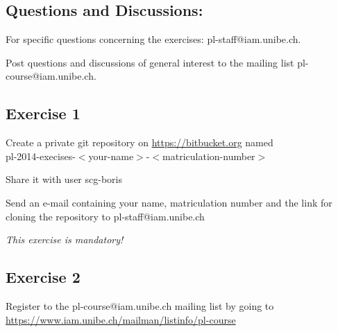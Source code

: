 \documentclass [11pt, a4wide, twoside]{article}
\begin{document}
\subsection*{Questions and Discussions:}
\begin{myitemize}
\item For specific questions concerning the exercises: pl-staff@iam.unibe.ch.
\item Post questions and discussions of general interest to the mailing list pl-course@iam.unibe.ch.
\end{myitemize}


\subsection*{Exercise 1}
\begin{myitemize}
\item Create a private git repository on \url{https://bitbucket.org} named \\
pl-2014-execises-$<$your-name$>$-$<$matriculation-number$>$
\item Share it with user scg-boris
\item Send an e-mail containing your name, matriculation number and the link for cloning the repository to pl-staff@iam.unibe.ch
\item \emph{This exercise is mandatory!}


\end{myitemize}

\subsection*{Exercise 2}
Register to the pl-course@iam.unibe.ch mailing list by going to \url{https://www.iam.unibe.ch/mailman/listinfo/pl-course}
\end{document}
